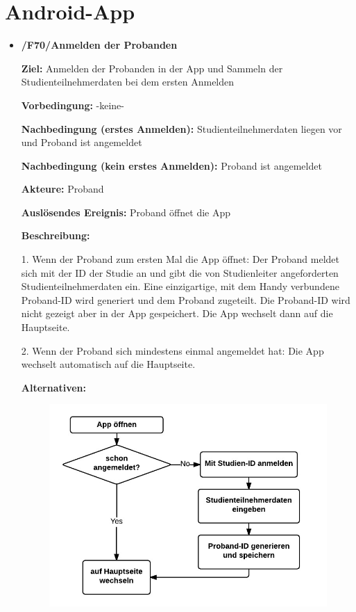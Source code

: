\documentclass[a4paper]{scrreprt}
\begin{document}
    \newpage
    \section{Android-App}

        \begin{itemize}
            \item \textbf{/F70/Anmelden der \gls{Proband}en}

                \par \textbf{Ziel: }Anmelden der \gls{Proband}en in der App und Sammeln der Studienteilnehmerdaten bei dem ersten Anmelden
                \par \textbf{Vorbedingung: }-keine-
                \par \textbf{Nachbedingung (erstes Anmelden): }Studienteilnehmerdaten liegen vor und \gls{Proband} ist angemeldet
                \par \textbf{Nachbedingung (kein erstes Anmelden): }\gls{Proband} ist angemeldet
                \par \textbf{Akteure: }\gls{Proband}
                \par \textbf{Auslösendes Ereignis: }\gls{Proband} öffnet die App
                \par \textbf{Beschreibung: }
                \par 1. Wenn der \gls{Proband} zum ersten Mal die App öffnet: Der \gls{Proband} meldet sich mit der ID der Studie an und gibt die von \gls{Studienleiter} angeforderten Studienteilnehmerdaten ein. Eine einzigartige, mit dem Handy verbundene \gls{Proband}-ID wird generiert und dem \gls{Proband} zugeteilt. Die \gls{Proband}-ID wird nicht gezeigt aber in der App gespeichert. Die App wechselt dann auf die Hauptseite.
                \par 2. Wenn der \gls{Proband} sich mindestens einmal angemeldet hat: Die App wechselt automatisch auf die Hauptseite.
                \par \textbf{Alternativen: }
                \begin{figure}[ht]
                    \centering
                    \includegraphics[scale=1]{AppAnmelden.jpeg}

\end{figure}
\end{itemize}
\end{document}
